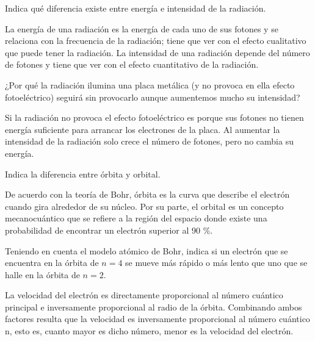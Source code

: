 \begin{question}
    Indica qué diferencia existe entre energía e intensidad de la radiación.
    \begin{solu}
        La energía de una radiación es la energía de cada uno de sus
        fotones y se relaciona con la frecuencia de la radiación; tiene
        que ver con el efecto cualitativo que puede tener la radiación.
        La intensidad de una radiación depende del número de fotones
        y tiene que ver con el efecto cuantitativo de la radiación.
    \end{solu}

\end{question}

\begin{question}
    ¿Por qué la radiación ilumina una placa metálica (y no provoca en ella efecto fotoeléctrico) seguirá sin provocarlo aunque aumentemos mucho su intensidad?
    \begin{solu}
        Si la radiación no provoca el efecto fotoeléctrico es porque
        sus fotones no tienen energía suficiente para arrancar los
        electrones de la placa.
        Al aumentar la intensidad de la radiación
        solo crece el número de fotones, pero no cambia su
        energía.
    \end{solu}
\end{question}

\begin{question}
    Indica la diferencia entre órbita y orbital.
    \begin{solu}
        De acuerdo con la teoría de Bohr, órbita es la curva que describe
        el electrón cuando gira alrededor de su núcleo.
        Por
        su parte, el orbital es un concepto mecanocuántico que se
        refiere a la región del espacio donde existe una probabilidad
        de encontrar un electrón superior al 90 \%.
    \end{solu}
\end{question}

\begin{question}
    Teniendo en cuenta el modelo atómico de Bohr, indica si un electrón que se encuentra en la órbita de \(n = 4\) se mueve más rápido o más lento que uno que se halle en la órbita de \(n = 2\).

    \begin{solu}
        La velocidad del electrón es directamente
        proporcional al número cuántico principal e inversamente
        proporcional al radio de la órbita.
        Combinando ambos factores
        resulta que la velocidad es inversamente proporcional al
        número cuántico n, esto es, cuanto mayor es dicho número,
        menor es la velocidad del electrón.
    \end{solu}
\end{question}

